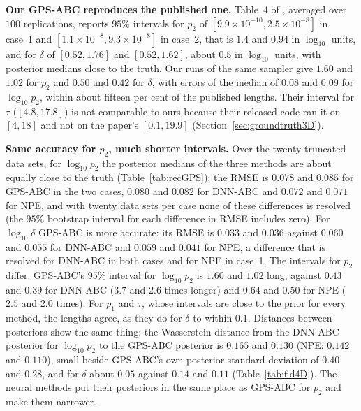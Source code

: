 \documentclass[sn-basic,iicol,pdflatex]{sn-jnl}
\begin{document}
\begin{table}[!t]
\centering
\caption{Study II, paired comparison on the first twenty data sets of each case. GPS-ABC chains are analyzed at
$2{,}000$ iterations with the first $500$ discarded; the last column is its wall-clock time for those $2{,}000$ iterations,
and for the others the time per data set (NPE: sampling only). RMSE is of the posterior median, interval length is the mean $95\%$
interval length on the $\log_{10}$ scale ($\tau$ in time units). Coverage of a single truth over twenty data sets takes values in steps of $0.05$.}
\label{tab:recGPS}
\scriptsize\renewcommand{\arraystretch}{0.92}\setlength{\tabcolsep}{3pt}

\end{table}

\noindent\textbf{Our GPS-ABC reproduces the published one.} Table~4 of \citet{lu2023}, averaged over $100$ replications, reports $95\%$
intervals for $p_2$ of $[9.9\times10^{-10},2.5\times10^{-8}]$ in case~1 and $[1.1\times10^{-8},9.3\times10^{-8}]$ in case~2, that is
$1.4$ and $0.94$ in $\log_{10}$ units, and for $\delta$ of $[0.52,1.76]$ and $[0.52,1.62]$, about $0.5$ in $\log_{10}$ units, with
posterior medians close to the truth. Our runs of the same sampler give $1.60$ and $1.02$ for $p_2$ and $0.50$ and $0.42$
for $\delta$, with errors of the median of $0.08$ and $0.09$ for $\log_{10}p_2$, within about fifteen per cent of the published lengths. Their interval for $\tau$ ($[4.8,17.8]$) is not comparable to ours
because their released code ran it on $[4,18]$ and not on the paper's $[0.1,19.9]$ (Section~\ref{sec:groundtruth3D}).

\noindent\textbf{Same accuracy for $p_2$, much shorter intervals.} Over the twenty truncated data sets, for $\log_{10}p_2$ the posterior medians of the three methods are about equally close to
the truth (Table~\ref{tab:recGPS}): the RMSE is $0.078$ and $0.085$ for GPS-ABC in the two cases, $0.080$ and $0.082$ for DNN-ABC and $0.072$ and $0.071$
for NPE, and with twenty data sets per case none of these differences is resolved (the $95\%$ bootstrap interval for each difference in RMSE includes zero). For $\log_{10}\delta$ GPS-ABC is
more accurate: its RMSE is $0.033$ and $0.036$ against $0.060$ and $0.055$ for DNN-ABC and $0.059$ and $0.041$ for NPE, a difference that is resolved for DNN-ABC in both cases and for NPE in case~1. The intervals for $p_2$ differ. GPS-ABC's $95\%$ interval for $\log_{10}p_2$ is $1.60$ and $1.02$ long, against $0.43$ and $0.39$ for DNN-ABC
($3.7$ and $2.6$ times longer) and $0.64$ and $0.50$ for NPE ($2.5$ and $2.0$ times). For $p_1$ and $\tau$, whose intervals are close to the prior for every method,
the lengths agree, as they do for $\delta$ to within $0.1$. Distances between posteriors show the same thing: the Wasserstein distance from the DNN-ABC posterior for $\log_{10}p_2$ to the GPS-ABC posterior is
$0.165$ and $0.130$ (NPE: $0.142$ and $0.110$), small beside GPS-ABC's own posterior standard deviation of $0.40$ and $0.28$, and for $\delta$ about $0.05$ against $0.14$ and $0.11$
(Table~\ref{tab:fid4D}). The neural methods put their posteriors in the same place as GPS-ABC for $p_2$ and make them narrower.
\end{document}
